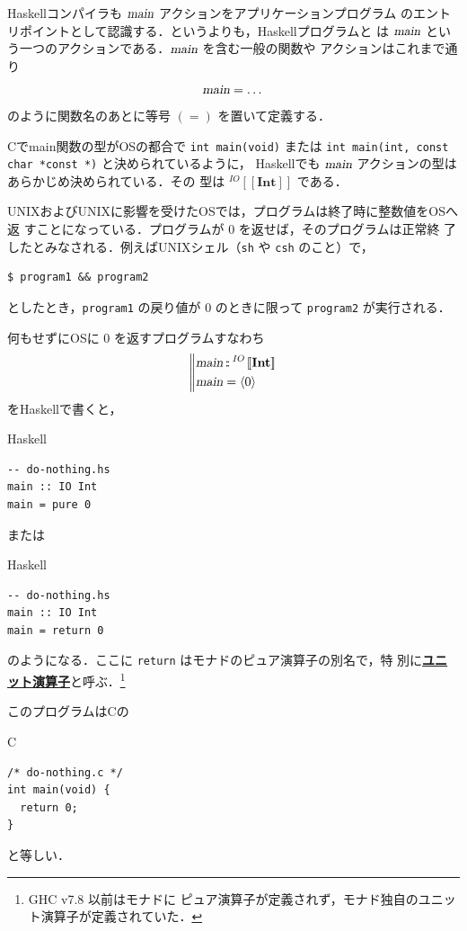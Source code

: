 \documentclass[a5paper,twoside,fleqn]{jsbook}
\def\[{\left[\!\left[}
\def\]{\right]\!\right]}
\newcommand{\programminglanguage}[1]{\textsf{#1}}
\newcommand{\clang}{\programminglanguage{C}}
\newcommand{\haskell}{\programminglanguage{Haskell}}
\newcommand{\keyword}[1]{{\underline{\textbf{#1}}}}
\newcommand{\code}[1]{\texttt{#1}}
\newcommand{\filename}[1]{\texttt{#1}}
\newenvironment{ccode}{\begin{itembox}[r]{\clang}}{\end{itembox}}
\newenvironment{haskellcode}{\begin{itembox}[r]{\haskell}}{\end{itembox}}
\newcommand{\mBrace}{\Vert}
\newcommand{\mAction}[1]{\textsl{#1}}
\DeclareMathOperator{\mMain}{\mAction{main}}
\DeclareMathOperator{\mIn}{{:\!:}}
\newcommand{\mType}[1]{\mathbf{#1}}
\newcommand{\mIntType}{\mType{Int}}
\newcommand{\mGenericTypeAssemble}[2]{{}^{\mTypeConstructor{#1}}\[\mType{#2}\]}
\newcommand{\mIOType}[1]{\mGenericTypeAssemble{IO}{#1}}
\newcommand{\mIOIntType}{\mIOType{\mIntType}}
\newcommand{\mTypeConstructor}[1]{\textit{#1}}
\newcommand{\mPureWith}[1]{\langle#1\rangle}
\begin{document}
\haskell コンパイラも $\mMain$ アクションをアプリケーションプログラム
のエントリポイントとして認識する．というよりも，\haskell プログラムと
は $\mMain$ という一つのアクションである．$\mMain$ を含む一般の関数や
アクションはこれまで通り
\begin{equation}
\mMain=\dots
\end{equation}
のように関数名のあとに等号 $(=)$ を置いて定義する．

\clang でmain関数の型がOSの都合で \code{int main(void)} または
\code{int main(int, const char *const *)} と決められているように，
\haskell でも $\mMain$ アクションの型はあらかじめ決められている．その
型は $\mIOIntType$ である．

UNIXおよびUNIXに影響を受けたOSでは，プログラムは終了時に整数値をOSへ返
すことになっている．プログラムが $0$ を返せば，そのプログラムは正常終
了したとみなされる．例えばUNIXシェル（\filename{sh} や \filename{csh}
  のこと）で，
\begin{verbatim}
$ program1 && program2
\end{verbatim}
としたとき，\filename{program1} の戻り値が $0$ のときに限って
\filename{program2} が実行される．

何もせずにOSに $0$ を返すプログラムすなわち
\begin{equation}
\left\mBrace
\begin{aligned}
\mMain&\mIn{}\mIOIntType\\
\mMain&=\mPureWith{0}
\end{aligned}
\right.
\end{equation}
を\haskell で書くと，
\begin{haskellcode}
\begin{verbatim}
-- do-nothing.hs
main :: IO Int
main = pure 0
\end{verbatim}
\end{haskellcode}
または
\begin{haskellcode}
\begin{verbatim}
-- do-nothing.hs
main :: IO Int
main = return 0
\end{verbatim}
\end{haskellcode}
のようになる．ここに \code{return} はモナドのピュア演算子の別名で，特
別に\keyword{ユニット演算子}と呼ぶ．\footnote{GHC v7.8 以前はモナドに
  ピュア演算子が定義されず，モナド独自のユニット演算子が定義されていた．}

このプログラムは\clang の
\begin{ccode}
\begin{verbatim}
/* do-nothing.c */
int main(void) {
  return 0;
}
\end{verbatim}
\end{ccode}
と等しい．
\end{document}
